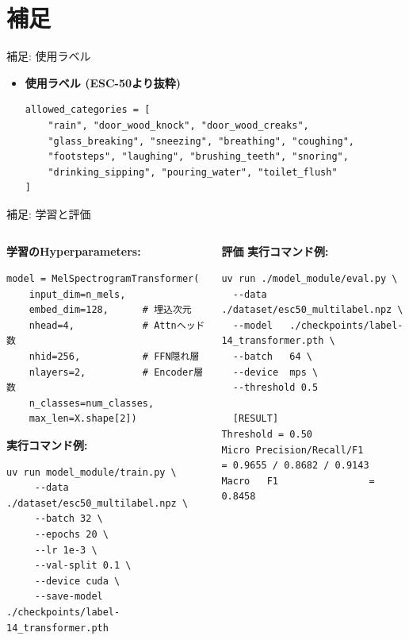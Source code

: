 \documentclass[unicode,12pt,aspectratio=169,dvipdfmx]{beamer}
\begin{document}
\section{補足}

\begin{frame}[fragile]{補足: 使用ラベル}
    \begin{itemize}
        \item \textbf{使用ラベル (ESC-50より抜粋)}
\begin{verbatim}
allowed_categories = [
    "rain", "door_wood_knock", "door_wood_creaks", 
    "glass_breaking", "sneezing", "breathing", "coughing",
    "footsteps", "laughing", "brushing_teeth", "snoring", 
    "drinking_sipping", "pouring_water", "toilet_flush"
]
    \end{verbatim}
    \end{itemize}
\end{frame}


\begin{frame}[fragile]{補足: 学習と評価}
    \begin{columns}[T]
        \begin{column}{0.5\textwidth}
            \textbf{学習のHyperparameters:}
\begin{verbatim}
model = MelSpectrogramTransformer(
    input_dim=n_mels,
    embed_dim=128,      # 埋込次元
    nhead=4,            # Attnヘッド数
    nhid=256,           # FFN隠れ層
    nlayers=2,          # Encoder層数
    n_classes=num_classes,
    max_len=X.shape[2])
\end{verbatim}
            \textbf{実行コマンド例:}
\begin{verbatim}
uv run model_module/train.py \
     --data ./dataset/esc50_multilabel.npz \
     --batch 32 \
     --epochs 20 \
     --lr 1e-3 \
     --val-split 0.1 \
     --device cuda \
     --save-model ./checkpoints/label-14_transformer.pth
\end{verbatim}
        \end{column}
        \begin{column}{0.5\textwidth}
            \textbf{評価}
             \textbf{実行コマンド例:}
\begin{verbatim}
uv run ./model_module/eval.py \
  --data    ./dataset/esc50_multilabel.npz \
  --model   ./checkpoints/label-14_transformer.pth \
  --batch   64 \
  --device  mps \
  --threshold 0.5

  [RESULT]
Threshold = 0.50
Micro Precision/Recall/F1 
= 0.9655 / 0.8682 / 0.9143
Macro   F1                = 0.8458

\end{verbatim}
        \end{column}
    \end{columns}
\end{frame}
\end{document}

